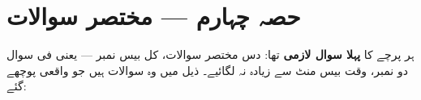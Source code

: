 %

\section*{حصہ چہارم --- مختصر سوالات}

\noindent
ہر پرچے کا \textbf{پہلا سوال لازمی} تھا: دس مختصر سوالات، کل بیس نمبر ---
یعنی فی سوال دو نمبر، وقت بیس منٹ سے زیادہ نہ لگائیے۔ ذیل میں وہ سوالات ہیں
جو واقعی پوچھے گئے:

